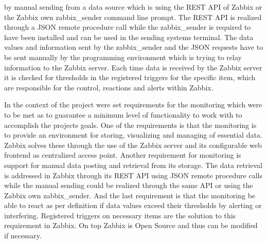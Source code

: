 by manual sending from a data source which is using the REST API of Zabbix or the Zabbix own zabbix\_sender command line prompt. The REST API is realized through a JSON remote procedure call while the zabbix\_sender is required to have been installed and can be used in the sending systems terminal. The data values and information sent by the zabbix\_sender and the JSON requests have to be sent manually by the programming environment which is trying to relay information to the Zabbix server. Each time data is received by the Zabbix server it is checked for thresholds in the registered triggers for the specific item, which are responsible for the control, reactions and alerts within Zabbix.\cite{zab2, zab3}
	
	In the context of the project were set requirements for the monitoring which were to be met as to guarantee a minimum level of functionality to work with to accomplish the projects goals. One of the requirements is that the monitoring is to provide an environment for storing, visualizing and managing of essential data. Zabbix solves these through the use of the Zabbix server and its configurable web frontend as centralized access point. Another requirement for monitoring is support for manual data posting and retrieval from its storage. The data retrieval is addressed in Zabbix through its REST API using JSON remote procedure calls while the manual sending could be realized through the same API or using the Zabbix own zabbix\_sender. And the last requirement is that the monitoring be able to react as per definition if data values exceed their thresholds by alerting or interfering. Registered triggers on necessary items are the solution to this requirement in Zabbix. On top Zabbix is Open Source and thus can be modified if necessary.
